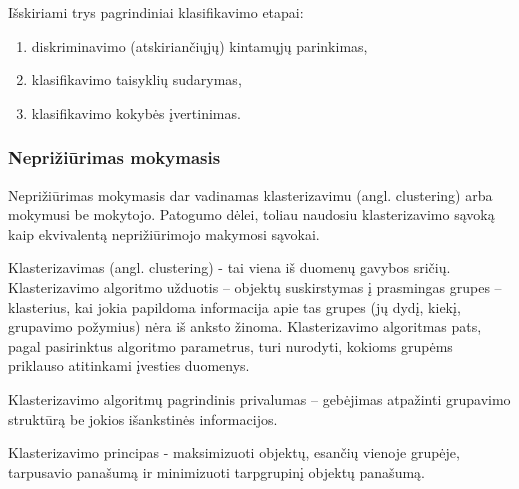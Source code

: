 Išskiriami trys pagrindiniai klasifikavimo etapai:
\begin{enumerate}
  \item diskriminavimo (atskiriančiųjų) kintamųjų parinkimas,
  \item klasifikavimo taisyklių sudarymas,
  \item klasifikavimo kokybės įvertinimas.
\end{enumerate}



\subsubsection{Neprižiūrimas mokymasis}

Neprižiūrimas mokymasis dar vadinamas klasterizavimu (angl. clustering) arba
mokymusi be mokytojo. Patogumo dėlei, toliau naudosiu klasterizavimo sąvoką kaip
ekvivalentą neprižiūrimojo makymosi sąvokai.


Klasterizavimas (angl.  clustering) - tai viena iš duomenų gavybos sričių. Klasterizavimo 
algoritmo užduotis – objektų suskirstymas  į prasmingas 
grupes – klasterius, kai jokia papildoma informacija apie tas grupes (jų dydį, kiekį, grupavimo požymius) nėra iš anksto žinoma.
%
% 
Klasterizavimo algoritmas pats, pagal pasirinktus algoritmo parametrus, turi nurodyti, kokioms 
grupėms priklauso atitinkami įvesties duomenys.\cite{martisiute08}

Klasterizavimo algoritmų pagrindinis privalumas – gebėjimas atpažinti grupavimo
struktūrą be jokios išankstinės informacijos.  

Klasterizavimo principas - maksimizuoti objektų, esančių vienoje grupėje,
tarpusavio panašumą ir minimizuoti tarpgrupinį objektų panašumą.

